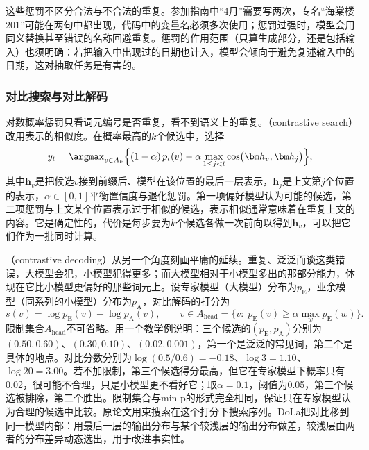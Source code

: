 这些惩罚不区分合法与不合法的重复。参加指南中“4月”需要写两次，专名“海棠楼201”可能在两句中都出现，代码中的变量名必须多次使用；惩罚过强时，模型会用同义替换甚至错误的名称回避重复。惩罚的作用范围（只算生成部分，还是包括输入）也须明确：若把输入中出现过的日期也计入，模型会倾向于避免复述输入中的日期，这对抽取任务是有害的。

\subsubsection{对比搜索与对比解码}
\label{sec:nlp-inference-contrastive}

对数概率惩罚只看词元编号是否重复，看不到语义上的重复。（contrastive search）改用表示的相似度。在概率最高的$k$个候选中，选择
\begin{equation}
 y_t=\argmax_{v\in A_k}\Bigl\{(1-\alpha)\,p_t(v)-\alpha\max_{1\leq j<t}\cos\bigl(\bm h_v,\bm h_{j}\bigr)\Bigr\},
 \label{eq:nlp-inference-contrastive-search}
\end{equation}
其中$\bm h_v$是把候选$v$接到前缀后、模型在该位置的最后一层表示，$\bm h_j$是上文第$j$个位置的表示，$\alpha\in[0,1]$平衡置信度与退化惩罚。第一项偏好模型认为可能的候选，第二项惩罚与上文某个位置表示过于相似的候选，表示相似通常意味着在重复上文的内容。它是确定性的，代价是每步要为$k$个候选各做一次前向以得到$\bm h_v$，可以把它们作为一批同时计算。

（contrastive decoding）从另一个角度刻画平庸的延续。重复、泛泛而谈这类错误，大模型会犯，小模型犯得更多；而大模型相对于小模型多出的那部分能力，体现在它比小模型更偏好的那些词元上。设专家模型（大模型）分布为$p_{\mathrm E}$，业余模型（同系列的小模型）分布为$p_{\mathrm A}$，对比解码的打分为
\begin{equation}
 s(v)=\log p_{\mathrm E}(v)-\log p_{\mathrm A}(v),\qquad
 v\in A_{\mathrm{head}}=\{v:\;p_{\mathrm E}(v)\geq\alpha\max_wp_{\mathrm E}(w)\}.
 \label{eq:nlp-inference-contrastive-decoding}
\end{equation}
限制集合$A_{\mathrm{head}}$不可省略。用一个教学例说明：三个候选的$(p_{\mathrm E},p_{\mathrm A})$分别为$(0.50,0.60)$、$(0.30,0.10)$、$(0.02,0.001)$，第一个是泛泛的常见词，第二个是具体的地点。对比分数分别为$\log(0.5/0.6)=-0.18$、$\log3=1.10$、$\log20=3.00$。若不加限制，第三个候选得分最高，但它在专家模型下概率只有0.02，很可能不合理，只是小模型更不看好它；取$\alpha=0.1$，阈值为0.05，第三个候选被排除，第二个胜出。限制集合与min-p的形式完全相同，保证只在专家模型认为合理的候选中比较。原论文用束搜索在这个打分下搜索序列。DoLa把对比移到同一模型内部：用最后一层的输出分布与某个较浅层的输出分布做差，较浅层由两者的分布差异动态选出，用于改进事实性。

